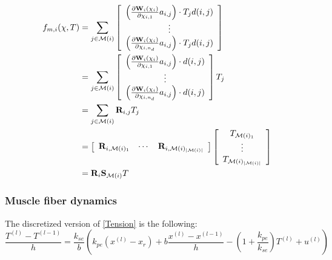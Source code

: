 \documentclass[a4paper,10pt]{article}
\begin{document}
\begin{align}
f_{m,i}(\chi ,T)
      & = \sum_{j \in \mathcal{M}(i)}\left [
\begin{array}{c}
\left( \frac{\partial\mathbf{W}_i(\chi_{i})}{\partial\chi_{i,1}} a_{i,j} \right) \cdot T_j d(i,j)\\
\vdots\\
\left( \frac{\partial\mathbf{W}_i(\chi_{i})}{\partial\chi_{i,n_d}} a_{i,j} \right) \cdot T_j d(i,j)
\end{array}
\right ]\notag\\
      & = \sum_{j \in \mathcal{M}(i)}\left [
\begin{array}{c}
\left( \frac{\partial\mathbf{W}_i(\chi_{i})}{\partial\chi_{i,1}} a_{i,j} \right) \cdot d(i,j) \\
\vdots\\
\left( \frac{\partial\mathbf{W}_i(\chi_{i})}{\partial\chi_{i,n_d}} a_{i,j} \right) \cdot d(i,j)
\end{array}
\right ]
T_j\notag\\
       & = \sum_{j \in \mathcal{M}(i)} \mathbf{R}_{i,j}
T_j\notag\\
       & =
\left [
\begin{array}{ccc}
\mathbf{R}_{i,\mathcal{M}(i)_1} &  \cdots  &  \mathbf{R}_{i,\mathcal{M}(i)_{|\mathcal{M}(i)|}}
\end{array}
\right ]
\left [
\begin{array}{c}
T_{\mathcal{M}(i)_1}\\
\vdots \\
T_{\mathcal{M}(i)_{|\mathcal{M}(i)|}}
\end{array}
\right ]\\
       & =
\mathbf{R}_i \mathbf{S}_{\mathcal{M}(i)} T
\end{align}

\subsubsection{Muscle fiber dynamics}
The discretized version of \eqref{Tension} is the following:
\begin{equation}
\frac{T^{(l)}-T^{(l-1)}}{h} 
           = \frac{k_{se}}{b} \left( k_{pe}(x^{(l)}-x_{r})+b\frac{x^{(l)}-x^{(l-1)}}{h}-\left(1+\frac{k_{pe}}{k_{se}}\right) T^{(l)} + u^{(l)}   \right)
\end{equation}
\end{document}
